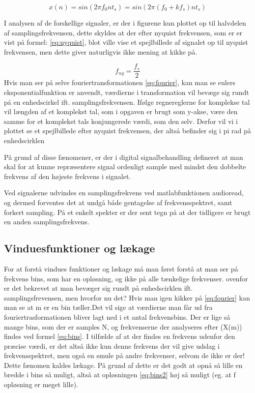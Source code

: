 \begin{equation}\label{eq:sinus1}
{x(n)} = sin(2\pi f_0 n t_s) =sin(2\pi (f_0+kf_s) n t_s) 
\end{equation}

  
I analysen af de forskellige signaler, er der i figurene kun plottet op til halvdelen af samplingsfrekvensen, dette skyldes at der efter nyquist frekvensen, som er er vist på formel: \eqref{eq:nyquist}, blot ville vise et spejlbillede af signalet op til nyquist frekvensen, men dette giver naturligvis ikke mening at kikke på.
 
  \begin{equation}\label{eq:nyquist}
  f_{ny} = \frac{f_s}{2} 
  \end{equation}
Hvis man ser på selve fouriertransformationen \eqref{eq:fourier}, kan man se eulers eksponentialfunktion er anvendt, værdierne i transformation vil bevæge sig rundt på en enhedscirkel ift. samplingsfrekvensen.  Ifølge regnereglerne for komplekse tal vil længden af et komplekst tal, som i opgaven er brugt som y-akse, være den samme for et komplekst tals konjungerede værdi, som den selv. Derfor vil vi i plottet se et spejlbillede efter nyquist frekvensen, der altså befinder sig i pi rad på enhedscirklen  
 
 På grund af disse fænomener, er der i digital signalbehandling defineret at man skal for at kunne repræsentere signal ordenligt sample med mindst den dobbelte frekvens af den højeste frekvens i signalet.
 
  Ved signalerne udvindes en samplingsfrekvens ved matlabfunktionen audioread, og dermed forventes det at undgå både gentagelse af frekvensspektret, samt forkert sampling. På et enkelt spekter er der sent tegn på at der tidligere er brugt en anden samplingsfrekvens.

\subsection{Vinduesfunktioner og lækage}
For at forstå vindues funktioner og lækage må man først forstå at man ser på frekvens bins, som har en opløsning, og ikke på alle tænkelige frekvenser. ovenfor er det bekrevet at man bevæger sig rundt på enhedscirklen ift. samplingsfrevensen, men hvorfor nu det? Hvis man igen kikker på \eqref{eq:fourier} kan man se at m er en bin tæller.Det vil sige at værdierne man får ud fra fouriertrasformationen bliver lagt ned i et antal frekvensbins. Der er lige så mange bins, som der er samples N, og frekvenserne der analyseres efter (X(m)) findes ved formel \eqref{eq:bins}. I tilfælde af at der findes en frekvens udenfor den præcise værdi, er det altså ikke kun denne frekvens der vil give udslag i frekvensspektret, men også en smule på andre frekvenser, selvom de ikke er der! Dette fænomen kaldes lækage. På grund af dette er det godt at opnå så lille en bredde i bins så muligt, altså at opløsningen \eqref{eq:bins2} høj så muligt (eg. at f opløsning er meget lille).  

